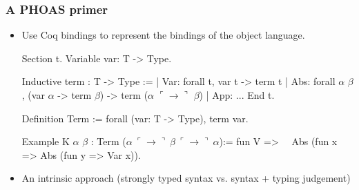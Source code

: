 \documentclass[9pt]{beamer}
\begin{document}
\phoasprimer{
}
\begin{frame}[fragile]
  \frametitle{A PHOAS primer}
  \begin{itemize}
  \item Use Coq bindings to represent the bindings of the object language.
    \newcommand\arrow{\ulcorner \to \urcorner}
\begin{coq}
Section t. 
  Variable var: T -> Type.
  
  Inductive term : T -> Type :=
  | Var: forall t, var t -> term t
  | Abs: forall $\alpha$ $\beta$, (var $\alpha$ -> term $\beta$) -> term ($\alpha$ $\arrow$ $\beta$)
  | App: ...
End t. 

Definition Term := forall (var: T -> Type), term var. 

Example K $\alpha$ $\beta$ : Term ($\alpha~\arrow{}~\beta{}~\arrow{}~\alpha$):= fun V =>
$\quad$Abs (fun x => Abs (fun y => Var x)).
\end{coq}

\pause

\item An \alert{intrinsic approach} (strongly typed syntax vs. syntax + typing judgement)
\end{itemize}
\end{frame}


\end{document}
